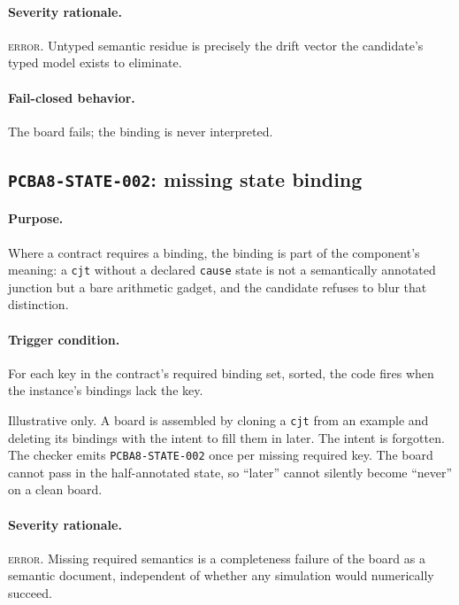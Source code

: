 \paragraph{Severity rationale.} \textsc{error}. Untyped semantic residue is precisely the drift vector the candidate's typed model exists to eliminate.

\paragraph{Fail-closed behavior.} The board fails; the binding is never interpreted.

\subsection{\texttt{PCBA8-STATE-002}: missing state binding}\label{ch07:sub:state002}

\paragraph{Purpose.} Where a contract requires a binding, the binding is part of the component's meaning: a \texttt{cjt} without a declared \texttt{cause} state is not a semantically annotated junction but a bare arithmetic gadget, and the candidate refuses to blur that distinction.

\paragraph{Trigger condition.} For each key in the contract's required binding set, sorted, the code fires when the instance's bindings lack the key.

\begin{example}\label{ch07:ex:state002}
Illustrative only. A board is assembled by cloning a \texttt{cjt} from an example and deleting its bindings with the intent to fill them in later. The intent is forgotten. The checker emits \texttt{PCBA8-STATE-002} once per missing required key. The board cannot pass in the half-annotated state, so ``later'' cannot silently become ``never'' on a clean board.
\end{example}

\paragraph{Severity rationale.} \textsc{error}. Missing required semantics is a completeness failure of the board as a semantic document, independent of whether any simulation would numerically succeed.

